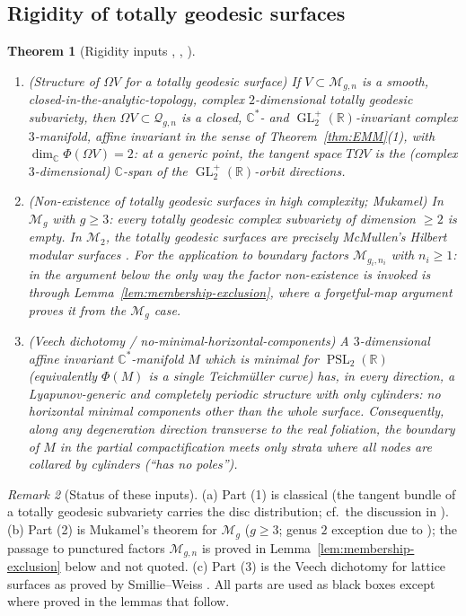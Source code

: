 \documentclass[11pt]{article}
\newcommand{\C}{\mathbb{C}}
\newcommand{\R}{\mathbb{R}}
\newcommand{\cQ}{\mathcal{Q}}
\newcommand{\M}{\mathcal{M}}
\DeclareMathOperator{\PSL}{PSL}
\DeclareMathOperator{\GL}{GL}
\newtheorem{thm}{Theorem}[section]
\theoremstyle{definition}
\theoremstyle{remark}
\newtheorem{rmk}[thm]{Remark}
\begin{document}
\subsection{Rigidity of totally geodesic surfaces}

\begin{thm}[Rigidity inputs \cite{Mukamel}, \cite{McMullenHMS},
\cite{SW}]\label{thm:Mukamel}
\begin{enumerate}[label=(\arabic*)]
\item \emph{(Structure of $\Omega V$ for a totally geodesic surface)}
If $V \subset \M_{g,n}$ is a smooth, closed-in-the-analytic-topology,
complex $2$-dimensional totally geodesic subvariety, then
$\Omega V \subset \cQ_{g,n}$ is a closed, $\C^*$- and
$\GL_2^+(\R)$-invariant complex $3$-manifold, affine invariant in the
sense of Theorem~\ref{thm:EMM}(1), with $\dim_{\C}\Phi(\Omega V) = 2$:
at a generic point, the tangent space $T\Omega V$ is the (complex
$3$-dimensional) $\C$-span of the $\GL_2^+(\R)$-orbit directions.
\item \emph{(Non-existence of totally geodesic surfaces in high
complexity; Mukamel)} In $\M_g$ with $g \ge 3$: every totally geodesic
complex subvariety of dimension $\ge 2$ is empty. In $\M_2$, the
totally geodesic surfaces are
precisely McMullen's Hilbert modular surfaces \cite{McMullenHMS}.
For the application to boundary factors $\M_{g_i,n_i}$ with
$n_i \ge 1$: in the argument below the only way the factor
non-existence is invoked is through Lemma~\ref{lem:membership-exclusion},
where a forgetful-map argument proves it from the $\M_g$ case.
\item \emph{(Veech dichotomy / no-minimal-horizontal-components)}
A $3$-dimensional affine invariant $\C^*$-manifold $M$ which is minimal
for $\PSL_2(\R)$ (equivalently $\Phi(M)$ is a single Teichm\"uller
curve) has, in every direction, a Lyapunov-generic and completely
periodic structure with only cylinders: no horizontal minimal components
other than the whole surface. Consequently, along any degeneration
direction transverse to the real foliation, the boundary of $M$ in the
partial compactification meets only strata where all nodes are
collared by cylinders (``has no poles'').
\end{enumerate}
\end{thm}

\begin{rmk}[Status of these inputs]\label{rmk:statusinputs}
(a) Part (1) is classical (the tangent bundle of a totally geodesic
subvariety carries the disc distribution; cf.\ the discussion in
\cite{Mukamel}). (b) Part (2) is Mukamel's theorem \cite{Mukamel} for
$\M_g$ ($g \ge 3$; genus $2$ exception due to \cite{McMullenHMS}); the
passage to punctured factors $\M_{g,n}$ is proved in
Lemma~\ref{lem:membership-exclusion} below and not quoted.
(c) Part (3) is the Veech dichotomy for lattice surfaces as proved by
Smillie--Weiss \cite{SW}. All parts are used as black boxes except
where proved in the lemmas that follow.
\end{rmk}
\end{document}
